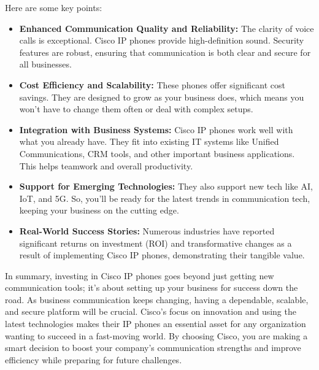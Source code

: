 \documentclass[11pt,a4paper]{article}
\begin{document}
Here are some key points:

\begin{itemize}
    \item \textbf{Enhanced Communication Quality and Reliability:} The clarity of voice calls is exceptional. Cisco IP phones provide high-definition sound. Security features are robust, ensuring that communication is both clear and secure for all businesses.
    \item \textbf{Cost Efficiency and Scalability:} These phones offer significant cost savings. They are designed to grow as your business does, which means you won’t have to change them often or deal with complex setups.
    \item \textbf{Integration with Business Systems:} Cisco IP phones work well with what you already have. They fit into existing IT systems like Unified Communications, CRM tools, and other important business applications. This helps teamwork and overall productivity.
    \item \textbf{Support for Emerging Technologies:} They also support new tech like AI, IoT, and 5G. So, you’ll be ready for the latest trends in communication tech, keeping your business on the cutting edge.
    \item \textbf{Real-World Success Stories:} Numerous industries have reported significant returns on investment (ROI) and transformative changes as a result of implementing Cisco IP phones, demonstrating their tangible value.
\end{itemize}

In summary, investing in Cisco IP phones goes beyond just getting new communication tools; it’s about setting up your business for success down the road. As business communication keeps changing, having a dependable, scalable, and secure platform will be crucial. Cisco's focus on innovation and using the latest technologies makes their IP phones an essential asset for any organization wanting to succeed in a fast-moving world. By choosing Cisco, you are making a smart decision to boost your company’s communication strengths and improve efficiency while preparing for future challenges.
\end{document}
